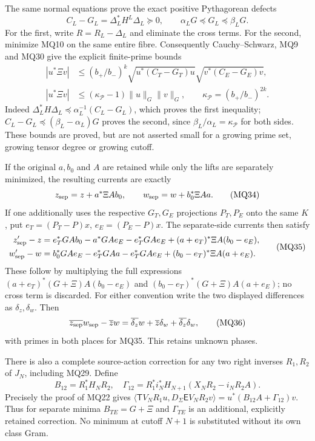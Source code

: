 \documentclass[11pt]{article}
\newcommand{\TT}{\mathsf T}
\newcommand{\EE}{\mathsf E}
\begin{document}
The same normal equations prove the exact positive Pythagorean
defects
\[
 C_L-G_L=\Delta_L^*H^L\Delta_L\succeq0,
 \qquad \alpha_LG\preceq G_L\preceq\beta_LG.                \tag{MQ32}
\]
For the first, write $R=R_L-\Delta_L$ and eliminate the cross
terms. For the second, minimize MQ10 on the same entire fibre.
Consequently Cauchy--Schwarz, MQ9 and MQ30 give the explicit
finite-prime bounds
\[
 \begin{split}
 |u^*\Xi v|&\le (b_+/b_-)^k
  \sqrt{u^*(C_T-G_T)u}\sqrt{v^*(C_E-G_E)v},\\
 |u^*\Xi v|&\le(\kappa_{\mathcal P}-1)\|u\|_G\|v\|_G,
 \qquad \kappa_{\mathcal P}=(b_+/b_-)^{2k}.
 \end{split}                                                \tag{MQ33}
\]
Indeed $\Delta_L^*H\Delta_L\preceq
\alpha_L^{-1}(C_L-G_L)$, which proves the first inequality;
$C_L-G_L\preceq(\beta_L-\alpha_L)G$ proves the second, since
$\beta_L/\alpha_L=\kappa_{\mathcal P}$ for both sides. These
bounds are proved, but are not asserted small for a growing prime
set, growing tensor degree or growing cutoff.

If the original $a,b_0$ and $A$ are retained while only the lifts
are separately minimized, the resulting currents are exactly
\[
 z_{\rm sep}=z+a^*\Xi A b_0,\qquad
 w_{\rm sep}=w+b_0^*\Xi A a.                               \tag{MQ34}
\]
If one additionally uses the respective $G_T,G_E$ projections
$P_T,P_E$ onto the same $K$, put $e_T=(P_T-P)x$,
$e_E=(P_E-P)x$. The separate-side currents then satisfy
\[
 \begin{split}
 z_{\rm sep}'-z={}&e_T^*GA b_0-a^*GAe_E-e_T^*GAe_E
       +(a+e_T)^*\Xi A(b_0-e_E),\\
 w_{\rm sep}'-w={}&b_0^*GAe_E-e_T^*GAa-e_T^*GAe_E
       +(b_0-e_T)^*\Xi A(a+e_E).
 \end{split}                                                 \tag{MQ35}
\]
These follow by multiplying the full expressions
$(a+e_T)^*(G+\Xi)A(b_0-e_E)$ and
$(b_0-e_T)^*(G+\Xi)A(a+e_E)$; no cross term is discarded.
For either convention write the two displayed differences as
$\delta_z,\delta_w$. Then
\[
 \overline{z_{\rm sep}}w_{\rm sep}-\overline zw
   =\overline{\delta_z}w+\overline z\delta_w
     +\overline{\delta_z}\delta_w,                          \tag{MQ36}
\]
with primes in both places for MQ35. This retains unknown phases.

There is also a complete source-action correction for any two
right inverses $R_1,R_2$ of $J_N$, including MQ29. Define
\[
 B_{12}=R_1^*H_NR_2,\quad
 \Gamma_{12}=R_1^*i_N^*H_{N+1}(X_NR_2-i_NR_2A).
                                                               \tag{MQ37}
\]
Precisely the proof of MQ22 gives
$\langle\TT V_NR_1u,D_\Sigma\EE V_NR_2v\rangle
=u^*(B_{12}A+\Gamma_{12})v$.
Thus for separate minima $B_{TE}=G+\Xi$ and $\Gamma_{TE}$ is
an additional, explicitly retained correction. No minimum at cutoff
$N+1$ is substituted without its own class Gram.
\end{document}
